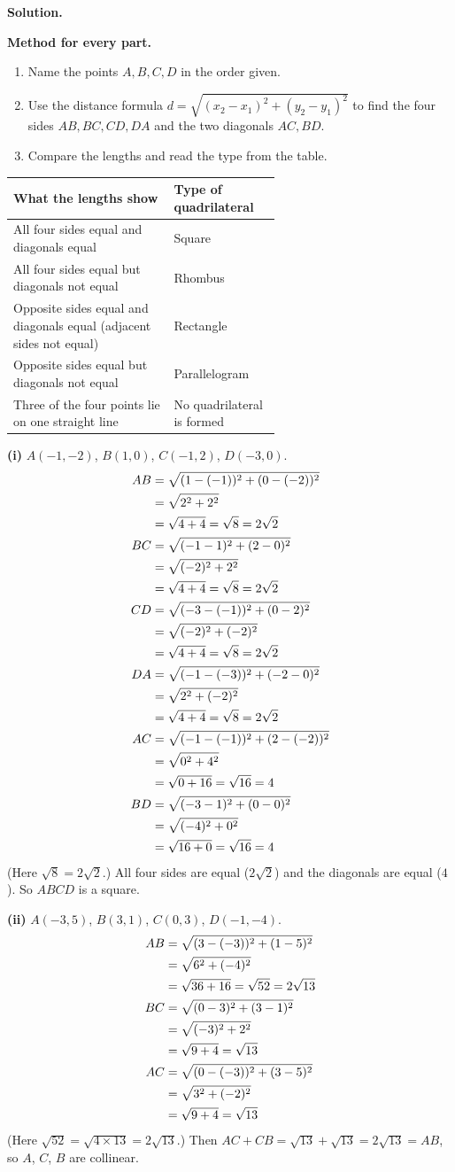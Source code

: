 \textbf{Solution.}

\textbf{Method for every part.}
\begin{enumerate}[label=\arabic*.,leftmargin=*,itemsep=1pt,topsep=2pt]
\item Name the points $A,B,C,D$ in the order given.
\item Use the distance formula $d=\sqrt{(x_2-x_1)^2+(y_2-y_1)^2}$ to find the four sides $AB,BC,CD,DA$ and the two diagonals $AC,BD$.
\item Compare the lengths and read the type from the table.
\end{enumerate}

\begin{center}
\begin{tabular}{|p{0.6\linewidth}|l|}
\hline
\textbf{What the lengths show} & \textbf{Type of quadrilateral}\\ \hline
All four sides equal and diagonals equal & Square\\
All four sides equal but diagonals not equal & Rhombus\\
Opposite sides equal and diagonals equal (adjacent sides not equal) & Rectangle\\
Opposite sides equal but diagonals not equal & Parallelogram\\
Three of the four points lie on one straight line & No quadrilateral is formed\\ \hline
\end{tabular}
\end{center}

\distnote

\textbf{(i)} $A(-1,-2)$, $B(1,0)$, $C(-1,2)$, $D(-3,0)$.
\begin{align*}
\dist{AB}{-1}{-2}{1}{0}{2\sqrt2}\\
\dist{BC}{1}{0}{-1}{2}{2\sqrt2}\\
\dist{CD}{-1}{2}{-3}{0}{2\sqrt2}\\
\dist{DA}{-3}{0}{-1}{-2}{2\sqrt2}\\
\dist{AC}{-1}{-2}{-1}{2}{4}\\
\dist{BD}{1}{0}{-3}{0}{4}
\end{align*}
(Here $\sqrt8=2\sqrt2$.) All four sides are equal ($2\sqrt2$) and the diagonals are equal ($4$). So $ABCD$ is a square.

\textbf{(ii)} $A(-3,5)$, $B(3,1)$, $C(0,3)$, $D(-1,-4)$.
\begin{align*}
\dist{AB}{-3}{5}{3}{1}{2\sqrt{13}}\\
\distn{BC}{3}{1}{0}{3}\\
\distn{AC}{-3}{5}{0}{3}
\end{align*}
(Here $\sqrt{52}=\sqrt{4\times13}=2\sqrt{13}$.) Then $AC+CB=\sqrt{13}+\sqrt{13}=2\sqrt{13}=AB$, so $A$, $C$, $B$ are collinear.

